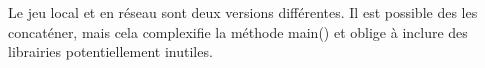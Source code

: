 \documentclass{article}
\begin{document}
Le jeu local et en réseau sont deux versions différentes. Il est possible des les concaténer, mais cela complexifie la méthode main() et oblige à inclure des librairies potentiellement inutiles.



\end{document}
